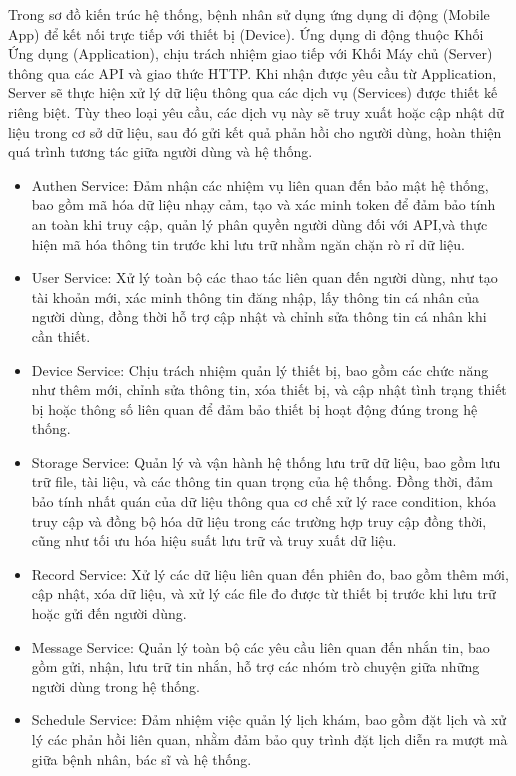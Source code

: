 Trong sơ đồ kiến trúc hệ thống, bệnh nhân sử dụng ứng dụng di động (Mobile App) để kết nối trực tiếp với thiết bị (Device).
Ứng dụng di động thuộc Khối Ứng dụng (Application), chịu trách nhiệm giao tiếp với Khối Máy chủ (Server) thông qua các API và giao thức HTTP.
Khi nhận được yêu cầu từ Application, Server sẽ thực hiện xử lý dữ liệu thông qua các dịch vụ (Services) được thiết kế riêng biệt.
Tùy theo loại yêu cầu, các dịch vụ này sẽ truy xuất hoặc cập nhật dữ liệu trong cơ sở dữ liệu, sau đó gửi kết quả phản hồi cho người dùng,
hoàn thiện quá trình tương tác giữa người dùng và hệ thống.\begin{adjustwidth}{1.5em}{}
	\begin{itemize}
		\item Authen Service: Đảm nhận các nhiệm vụ liên quan đến bảo mật hệ thống, bao gồm mã hóa dữ liệu nhạy cảm, tạo và xác minh token để đảm bảo tính an toàn khi truy cập,
		      quản lý phân quyền người dùng đối với API,và thực hiện mã hóa thông tin trước khi lưu trữ nhằm ngăn chặn rò rỉ dữ liệu.
		\item User Service: Xử lý toàn bộ các thao tác liên quan đến người dùng, như tạo tài khoản mới, xác minh thông tin đăng nhập, lấy thông tin cá nhân của người dùng,
		      đồng thời hỗ trợ cập nhật và chỉnh sửa thông tin cá nhân khi cần thiết.
		\item Device Service: Chịu trách nhiệm quản lý thiết bị, bao gồm các chức năng như thêm mới, chỉnh sửa thông tin, xóa thiết bị,
		      và cập nhật tình trạng thiết bị hoặc thông số liên quan để đảm bảo thiết bị hoạt động đúng trong hệ thống.
		\item Storage Service: Quản lý và vận hành hệ thống lưu trữ dữ liệu, bao gồm lưu trữ file, tài liệu, và các thông tin quan trọng của hệ thống.
		      Đồng thời, đảm bảo tính nhất quán của dữ liệu thông qua cơ chế xử lý race condition, khóa truy cập và đồng bộ hóa dữ liệu trong các trường hợp truy cập đồng thời,
		      cũng như tối ưu hóa hiệu suất lưu trữ và truy xuất dữ liệu.
		\item Record Service: Xử lý các dữ liệu liên quan đến phiên đo, bao gồm thêm mới, cập nhật, xóa dữ liệu, và xử lý các file đo được từ thiết bị trước khi lưu trữ hoặc gửi đến người dùng.
		\item Message Service: Quản lý toàn bộ các yêu cầu liên quan đến nhắn tin, bao gồm gửi, nhận, lưu trữ tin nhắn, hỗ trợ các nhóm trò chuyện giữa những người dùng trong hệ thống.
		\item Schedule Service: Đảm nhiệm việc quản lý lịch khám, bao gồm đặt lịch và xử lý các phản hồi liên quan, nhằm đảm bảo quy trình đặt lịch diễn ra mượt mà giữa bệnh nhân, bác sĩ và hệ thống.

\end{itemize}
\end{adjustwidth}

